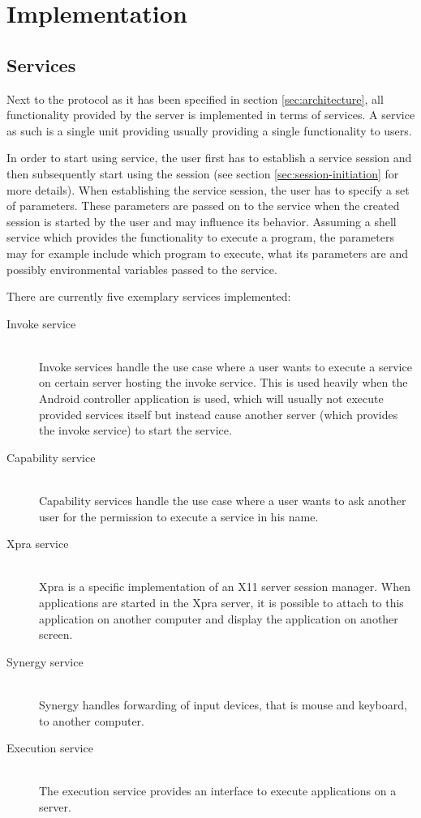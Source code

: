 \section{Implementation}

\subsection{Services}
\label{sec:services}

Next to the protocol as it has been specified in section \ref{sec:architecture}, all functionality provided by the server is implemented in terms of services.
A service as such is a single unit providing usually providing a single functionality to users.

In order to start using service, the user first has to establish a service session and then subsequently start using the session (see section \ref{sec:session-initiation} for more details).
When establishing the service session, the user has to specify a set of parameters.
These parameters are passed on to the service when the created session is started by the user and may influence its behavior.
Assuming a shell service which provides the functionality to execute a program, the parameters may for example include which program to execute, what its parameters are and possibly environmental variables passed to the service.

There are currently five exemplary services implemented:
\begin{description}
    \item[Invoke service]\hfill\\
        Invoke services handle the use case where a user wants to execute a service on certain server hosting the invoke service.
        This is used heavily when the Android controller application is used, which will usually not execute provided services itself but instead cause another server (which provides the invoke service) to start the service.
    \item[Capability service]\hfill\\
        Capability services handle the use case where a user wants to ask another user for the permission to execute a service in his name.
    \item[Xpra service]\hfill\\
        Xpra is a specific implementation of an X11 server session manager.
        When applications are started in the Xpra server, it is possible to attach to this application on another computer and display the application on another screen.
    \item[Synergy service]\hfill\\
        Synergy handles forwarding of input devices, that is mouse and keyboard, to another computer.
    \item[Execution service]\hfill\\
        The execution service provides an interface to execute applications on a server.
\end{description}

